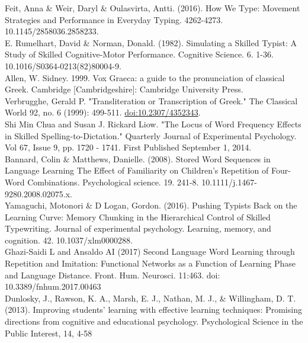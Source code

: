 \documentclass[11pt]{article}
\begin{document}
Feit, Anna \& Weir, Daryl \& Oulasvirta, Antti. (2016). How We Type: Movement Strategies and Performance in Everyday Typing. 4262-4273. 10.1145/2858036.2858233. \\

E. Rumelhart, David \& Norman, Donald. (1982). Simulating a Skilled Typist: A Study of Skilled Cognitive-Motor Performance. Cognitive Science. 6. 1-36. 10.1016/S0364-0213(82)80004-9. \\

Allen, W. Sidney. 1999. Vox Graeca: a guide to the pronunciation of classical Greek. Cambridge [Cambridgeshire]: Cambridge University Press. \\

Verbrugghe, Gerald P. "Transliteration or Transcription of Greek." The Classical World 92, no. 6 (1999): 499-511. \url{doi:10.2307/4352343}. \\

Shi Min Chua and Susan J. Rickard Liow. "The Locus of Word Frequency Effects in Skilled Spelling-to-Dictation."
Quarterly Journal of Experimental Psychology. Vol 67, Issue 9, pp. 1720 - 1741. First Published September 1, 2014. \\

Bannard, Colin \& Matthews, Danielle. (2008). Stored Word Sequences in Language Learning The Effect of Familiarity on Children's Repetition of Four-Word Combinations. Psychological science. 19. 241-8. 10.1111/j.1467-9280.2008.02075.x. \\

Yamaguchi, Motonori \& D Logan, Gordon. (2016). Pushing Typists Back on the Learning Curve: Memory Chunking in the Hierarchical Control of Skilled Typewriting. Journal of experimental psychology. Learning, memory, and cognition. 42. 10.1037/xlm0000288. \\

Ghazi-Saidi L and Ansaldo AI (2017) Second Language Word Learning through Repetition and Imitation: Functional Networks as a Function of Learning Phase and Language Distance. Front. Hum. Neurosci. 11:463. doi: 10.3389/fnhum.2017.00463 \\

Dunlosky, J., Rawson, K. A., Marsh, E. J., Nathan, M. J., \& Willingham, D. T. (2013). Improving students’ learning with effective learning techniques: Promising directions from cognitive and educational psychology. Psychological Science in the Public Interest, 14, 4-58 \\
\end{document}
